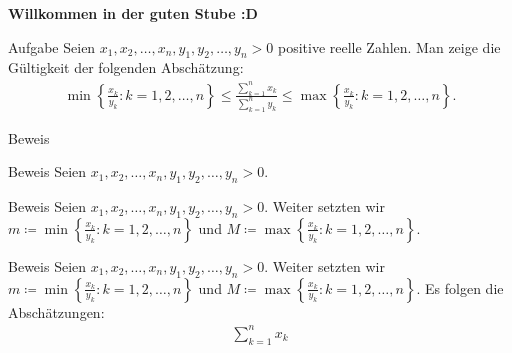 \documentclass[10pt]{beamer}
\title{}
\author{Artur's \( \oint \) Mathematikstübchen}
\date{}
\begin{document}

\begin{frame}
    \begin{center}
        \textbf{\huge Willkommen in der guten Stube \newline \newline :D}
    \end{center}
\end{frame}




\begin{frame}
    \begin{alertblock}{Aufgabe}
        Seien \( x_{1}, x_{2}, \ldots, x_{n}, y_{1}, y_{2}, \ldots, y_{n} > 0 \) positive reelle Zahlen. Man zeige die Gültigkeit der folgenden Abschätzung:
        \begin{align*}
            \min\left\{ \frac{x_{k}}{y_{k}} : k = 1, 2, \ldots, n \right\}
            \leq \frac{\sum_{k = 1}^{n} x_{k}}{\sum_{k = 1}^{n} y_{k}}
            \leq \max\left\{ \frac{x_{k}}{y_{k}} : k = 1, 2, \ldots, n \right\}.
        \end{align*}
    \end{alertblock}
\end{frame}



\begin{frame}{Beweis}
    
\end{frame}



\begin{frame}{Beweis}
    Seien \( x_{1}, x_{2}, \ldots, x_{n}, y_{1}, y_{2}, \ldots, y_{n} > 0 \).
\end{frame}


\begin{frame}{Beweis}
     Seien \( x_{1}, x_{2}, \ldots, x_{n}, y_{1}, y_{2}, \ldots, y_{n} > 0 \). Weiter setzten wir \( m \coloneq \min\left\{ \frac{x_{k}}{y_{k}} : k = 1, 2, \ldots, n \right\} \) und \( M \coloneq \max\left\{ \frac{x_{k}}{y_{k}} : k = 1, 2, \ldots, n \right\} \).
\end{frame}



\begin{frame}{Beweis}
     Seien \( x_{1}, x_{2}, \ldots, x_{n}, y_{1}, y_{2}, \ldots, y_{n} > 0 \). Weiter setzten wir \( m \coloneq \min\left\{ \frac{x_{k}}{y_{k}} : k = 1, 2, \ldots, n \right\} \) und \( M \coloneq \max\left\{ \frac{x_{k}}{y_{k}} : k = 1, 2, \ldots, n \right\} \). Es folgen die Abschätzungen:
     \begin{align*}
        \sum_{k = 1}^{n} x_{k}
     \end{align*}
\end{frame}
\end{document}

